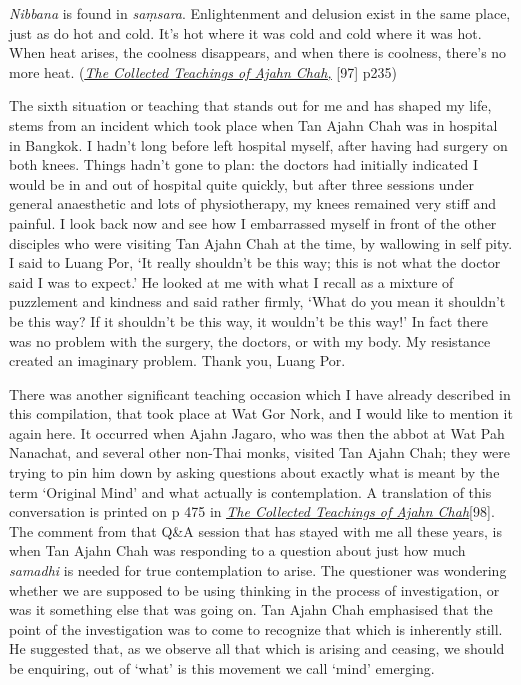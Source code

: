 \emph{Nibbana} is found in \emph{saṃsara}. Enlightenment and delusion
exist in the same place, just as do hot and cold. It's hot where it was
cold and cold where it was hot. When heat arises, the coolness
disappears, and when there is coolness, there's no more heat.
(\emph{\href{https://forestsangha.org/teachings/books/the-collected-teachings-of-ajahn-chah-single-volume?language=English}{\underline{The
Collected Teachings of Ajahn Chah,}}} {[}97{]} p235)

The sixth situation or teaching that stands out for me and has shaped my
life, stems from an incident which took place when Tan Ajahn Chah was in
hospital in Bangkok. I hadn't long before left hospital myself, after
having had surgery on both knees. Things hadn't gone to plan: the
doctors had initially indicated I would be in and out of hospital quite
quickly, but after three sessions under general anaesthetic and lots of
physiotherapy, my knees remained very stiff and painful. I look back now
and see how I embarrassed myself in front of the other disciples who
were visiting Tan Ajahn Chah at the time, by wallowing in self pity. I
said to Luang Por, `It really shouldn't be this way; this is not what
the doctor said I was to expect.' He looked at me with what I recall as
a mixture of puzzlement and kindness and said rather firmly, `What do
you mean it shouldn't be this way? If it shouldn't be this way, it
wouldn't be this way!' In fact there was no problem with the surgery,
the doctors, or with my body. My resistance created an imaginary
problem. Thank you, Luang Por.

There was another significant teaching occasion which I have already
described in this compilation, that took place at Wat Gor Nork, and I
would like to mention it again here. It occurred when Ajahn Jagaro, who
was then the abbot at Wat Pah Nanachat, and several other non-Thai
monks, visited Tan Ajahn Chah; they were trying to pin him down by
asking questions about exactly what is meant by the term `Original Mind'
and what actually is contemplation. A translation of this conversation
is printed on p 475 in
\href{https://forestsangha.org/teachings/books/the-collected-teachings-of-ajahn-chah-single-volume?language=English}{\emph{\underline{The
Collected Teachings of Ajahn Chah}}}{[}98{]}. The comment from that Q\&A
session that has stayed with me all these years, is when Tan Ajahn Chah
was responding to a question about just how much \emph{samadhi} is
needed for true contemplation to arise. The questioner was wondering
whether we are supposed to be using thinking in the process of
investigation, or was it something else that was going on. Tan Ajahn
Chah emphasised that the point of the investigation was to come to
recognize that which is inherently still. He suggested that, as we
observe all that which is arising and ceasing, we should be enquiring,
out of `what' is this movement we call `mind' emerging.

